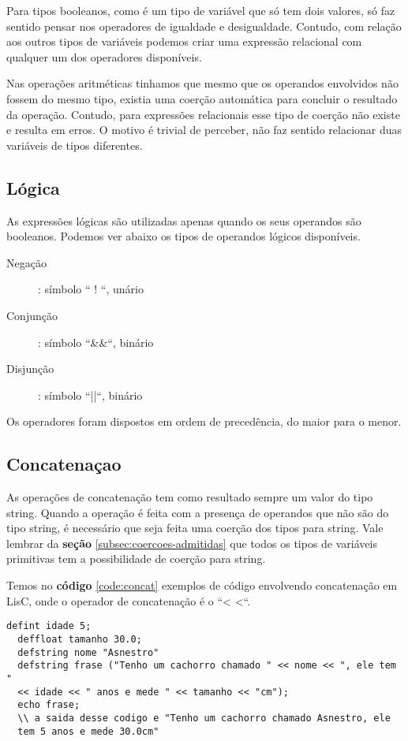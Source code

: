 \documentclass[
  12pt,				%
  oneside,			%
  a4paper,			%
  english,			%
  french,				%
  spanish,			%
  brazil,				%
]{abntex2}
\begin{document}
Para tipos booleanos, como é um tipo de variável que só tem dois
valores, só faz sentido pensar nos operadores de igualdade e
desigualdade. Contudo, com relação aos outros tipos de variáveis
podemos criar uma expressão relacional com qualquer um dos operadores
disponíveis.

Nas operações aritméticas tinhamos que mesmo que os
operandos envolvidos não fossem do mesmo tipo, existia uma coerção
automática para concluir o resultado da operação. Contudo, para
expressões relacionais esse tipo de coerção não existe e resulta em
erros. O motivo é trivial de perceber, não faz sentido relacionar duas
variáveis de tipos diferentes.

\subsection{Lógica}
\label{subsec:logicas}

As expressões lógicas são utilizadas apenas quando os seus operandos
são booleanos. Podemos ver abaixo os tipos de operandos lógicos
disponíveis.

\begin{description}
\item [Negação]: símbolo `` ! ``, unário
\item [Conjunção]: símbolo ``\&\&``, binário
\item [Disjunção]: símbolo ``||``, binário
\end{description}

Os operadores foram dispostos em ordem de precedência, do maior para o
menor.

\subsection{Concatenaçao}
\label{subsec:concatenacao}

As operações de concatenação tem como resultado sempre um valor do
tipo string. Quando a operação é feita com a presença de operandos que
não são do tipo string, é necessário que seja feita uma coerção dos
tipos para string. Vale lembrar da \textbf{seção} \ref{subsec:coercoes-admitidas} que todos os tipos de
variáveis primitivas tem a possibilidade de coerção para
string.


Temos no \textbf{código} \ref{code:concat} exemplos de código
envolvendo concatenação em LisC, onde o operador de concatenação é o
``< <``.

\begin{lstlisting}[label=code:concat,caption=Exemplo de expressões de concatenação]
  defint idade 5;
  deffloat tamanho 30.0;
  defstring nome "Asnestro"
  defstring frase ("Tenho um cachorro chamado " << nome << ", ele tem "
  << idade << " anos e mede " << tamanho << "cm");
  echo frase;
  \\ a saida desse codigo e "Tenho um cachorro chamado Asnestro, ele
  tem 5 anos e mede 30.0cm"
\end{lstlisting}
\end{document}
